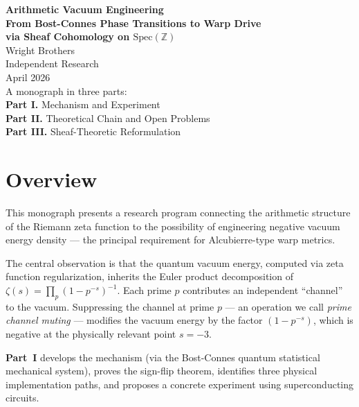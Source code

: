 \documentclass[11pt,a4paper]{article}
\newcommand{\Spec}{\mathrm{Spec}}
\begin{document}
\begin{titlepage}
\centering
\vspace*{3cm}
{\Huge\bfseries Arithmetic Vacuum Engineering\\[0.5cm]
\Large From Bost-Connes Phase Transitions to Warp Drive\\[0.3cm]
via Sheaf Cohomology on $\Spec(\mathbb{Z})$\\[2cm]}
{\Large Wright Brothers\\[0.5cm]}
{\large Independent Research\\[1cm]}
{\large April 2026\\[3cm]}
{\normalsize
A monograph in three parts:\\[0.5cm]
\textbf{Part I.} Mechanism and Experiment\\
\textbf{Part II.} Theoretical Chain and Open Problems\\
\textbf{Part III.} Sheaf-Theoretic Reformulation\\[2cm]
}
\vfill
\end{titlepage}

\tableofcontents
\newpage


\section*{Overview}

This monograph presents a research program connecting the arithmetic
structure of the Riemann zeta function to the possibility of
engineering negative vacuum energy density --- the principal
requirement for Alcubierre-type warp metrics.

The central observation is that the quantum vacuum energy, computed
via zeta function regularization, inherits the Euler product
decomposition of $\zeta(s) = \prod_p (1 - p^{-s})^{-1}$.
Each prime $p$ contributes an independent ``channel'' to the vacuum.
Suppressing the channel at prime $p$ --- an operation we call
\emph{prime channel muting} --- modifies the vacuum energy by
the factor $(1 - p^{-s})$, which is negative at the physically
relevant point $s = -3$.

\textbf{Part~I} develops the mechanism (via the Bost-Connes quantum
statistical mechanical system), proves the sign-flip theorem,
identifies three physical implementation paths, and proposes a
concrete experiment using superconducting circuits.
\end{document}
